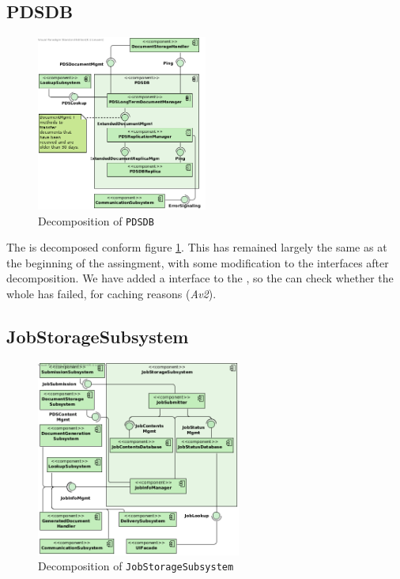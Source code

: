 \subsection{PDSDB}
\begin{figure}[!htp]
    \centering
    \includegraphics[width=0.5\textwidth]{figures/PDSDB.png}
    \caption{Decomposition of \texttt{PDSDB}}\label{fig:decomp-pdsdb}
\end{figure}

The  is decomposed conform figure \ref{fig:decomp-pdsdb}. This has remained largely the same as at the beginning of the assingment, with some modification to the interfaces after decomposition. We have added a  interface to the , so the  can check whether the whole  has failed, for caching reasons (\emph{Av2}).

\subsection{JobStorageSubsystem}
\begin{figure}[!htp]
    \centering
    \includegraphics[width=0.6\textwidth]{figures/Job Storage Subsystem.png}
    \caption{Decomposition of \texttt{JobStorageSubsystem}}\label{fig:decomp-jobsub}
\end{figure}

